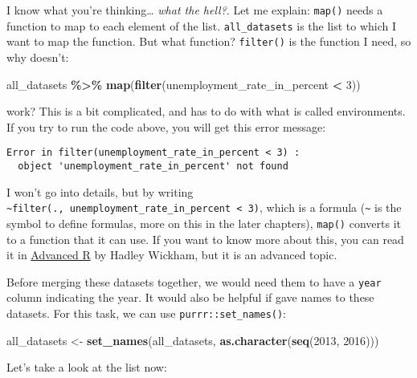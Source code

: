 \documentclass[
]{article}
\newenvironment{Shaded}{\begin{snugshade}}{\end{snugshade}}
\newcommand{\DecValTok}[1]{\textcolor[rgb]{0.00,0.00,0.81}{#1}}
\newcommand{\KeywordTok}[1]{\textcolor[rgb]{0.13,0.29,0.53}{\textbf{#1}}}
\newcommand{\NormalTok}[1]{#1}
\newcommand{\OperatorTok}[1]{\textcolor[rgb]{0.81,0.36,0.00}{\textbf{#1}}}
\newcommand{\StringTok}[1]{\textcolor[rgb]{0.31,0.60,0.02}{#1}}
\begin{document}
I know what you're thinking\ldots{} \emph{what the hell?}. Let me explain: \texttt{map()} needs a function to map to
each element of the list. \texttt{all\_datasets} is the list to which I want to map the function. But what
function? \texttt{filter()} is the function I need, so why doesn't:

\begin{Shaded}
\begin{Highlighting}[]
\NormalTok{all\_datasets }\OperatorTok{\%\textgreater{}\%}
\StringTok{  }\KeywordTok{map}\NormalTok{(}\KeywordTok{filter}\NormalTok{(unemployment\_rate\_in\_percent }\OperatorTok{\textless{}}\StringTok{ }\DecValTok{3}\NormalTok{))}
\end{Highlighting}
\end{Shaded}

work? This is a bit complicated, and has to do with what is called environments. If you try to run
the code above, you will get this error message:

\begin{verbatim}
Error in filter(unemployment_rate_in_percent < 3) :
  object 'unemployment_rate_in_percent' not found
\end{verbatim}

I won't go into details, but by writing \texttt{\textasciitilde{}filter(.,\ unemployment\_rate\_in\_percent\ \textless{}\ 3)}, which is a
formula (\texttt{\textasciitilde{}} is the symbol to define formulas, more on this in the later chapters), \texttt{map()}
converts it to a function that it can use. If you want to know more about this, you can read it in
\href{http://adv-r.had.co.nz/Functional-programming.html\#closures}{Advanced R} by Hadley Wickham, but it
is an advanced topic.

Before merging these datasets together, we would need them to have a \texttt{year} column indicating the
year. It would also be helpful if gave names to these datasets. For this task, we can use
\texttt{purrr::set\_names()}:

\begin{Shaded}
\begin{Highlighting}[]
\NormalTok{all\_datasets \textless{}{-}}\StringTok{ }\KeywordTok{set\_names}\NormalTok{(all\_datasets, }\KeywordTok{as.character}\NormalTok{(}\KeywordTok{seq}\NormalTok{(}\DecValTok{2013}\NormalTok{, }\DecValTok{2016}\NormalTok{)))}
\end{Highlighting}
\end{Shaded}

Let's take a look at the list now:
\end{document}
